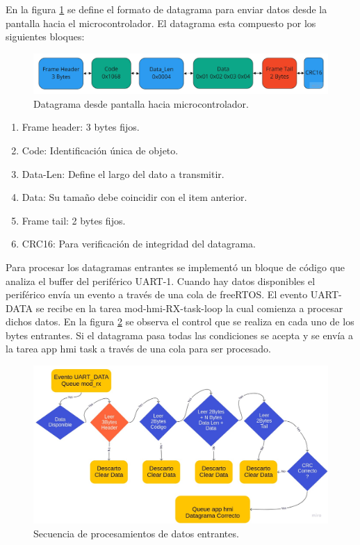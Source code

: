 En la figura \ref{fig:datagrama_a} se define el formato de datagrama para enviar datos desde la pantalla hacia el microcontrolador. El datagrama esta compuesto por los siguientes bloques:

\begin{figure}[h!]
	\centering
	\includegraphics[width=1\textwidth]{./Figures/datagrama_a.jpg}
	\caption{Datagrama desde pantalla hacia microcontrolador.}
	\label{fig:datagrama_a}
\end{figure}

\begin{enumerate}

\item Frame header: 3 bytes fijos.
\item Code: Identificación única de objeto.
\item Data-Len: Define el largo del dato a transmitir.
\item Data: Su tamaño debe coincidir con el item anterior.
\item Frame tail: 2 bytes fijos.
\item CRC16: Para verificación de integridad del datagrama.

\end{enumerate}

Para procesar los datagramas entrantes se implementó un bloque de código que analiza el buffer del periférico UART-1. Cuando hay datos disponibles el periférico envía un evento a través de una cola de freeRTOS. El evento UART-DATA se recibe en la tarea mod-hmi-RX-task-loop la cual comienza a procesar dichos datos. En la figura \ref{fig:secuencia_a} se observa el control que se realiza en cada uno de los bytes entrantes. Si el datagrama pasa todas las condiciones se acepta y se envía a la tarea app hmi task a través de una cola para ser procesado.


\begin{figure}[h!]
	\centering
	\includegraphics[width=\textwidth]{./Figures/Secuencia_lectura_uart.jpg}
	\caption{Secuencia de procesamientos de datos entrantes.}
	\label{fig:secuencia_a}
\end{figure}

